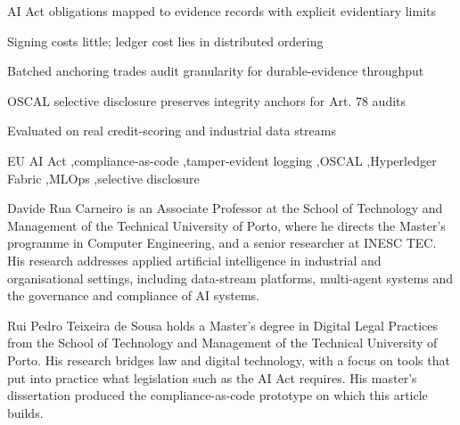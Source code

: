 \documentclass[a4paper,fleqn]{cas-dc}
\begin{document}
\begin{highlights}
\item AI Act obligations mapped to evidence records with explicit evidentiary limits
\item Signing costs little; ledger cost lies in distributed ordering
\item Batched anchoring trades audit granularity for durable-evidence throughput
\item OSCAL selective disclosure preserves integrity anchors for Art. 78 audits
\item Evaluated on real credit-scoring and industrial data streams
\end{highlights}

\begin{keywords}
EU AI Act \sep compliance-as-code \sep tamper-evident logging \sep OSCAL \sep Hyperledger Fabric \sep MLOps \sep selective disclosure
\end{keywords}

\maketitle















\bio{}
Davide Rua Carneiro is an Associate Professor at the School of Technology and Management of the Technical University of Porto, where he directs the Master's programme in Computer Engineering, and a senior researcher at INESC TEC. His research addresses applied artificial intelligence in industrial and organisational settings, including data-stream platforms, multi-agent systems and the governance and compliance of AI systems. 
\endbio

\bio{}
Rui Pedro Teixeira de Sousa holds a Master’s degree in Digital Legal Practices from the School of Technology and Management of the Technical University of Porto. His research bridges law and digital technology, with a focus on tools that put into practice what legislation such as the AI Act requires. His master’s dissertation produced the compliance-as-code prototype on which this article builds.\endbio
\end{document}
